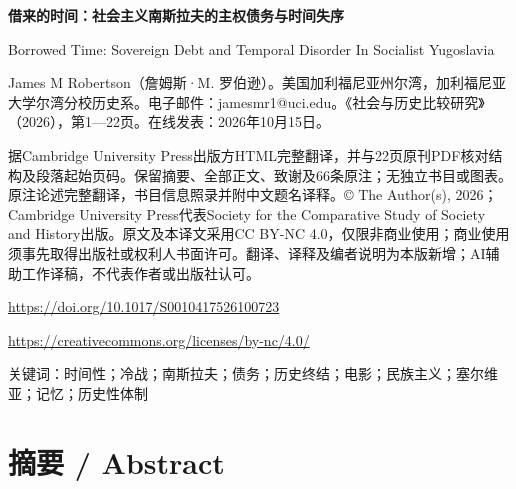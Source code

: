 \documentclass[10pt,a4paper]{article}
\begin{document}
{\Large\bfseries 借来的时间：社会主义南斯拉夫的主权债务与时间失序\par}\medskip
Borrowed Time: Sovereign Debt and Temporal Disorder In Socialist Yugoslavia\par
James M Robertson（詹姆斯·M. 罗伯逊）。美国加利福尼亚州尔湾，加利福尼亚大学尔湾分校历史系。电子邮件：jamesmr1@uci.edu。《社会与历史比较研究》（2026），第1—22页。在线发表：2026年10月15日。\par
据Cambridge University Press出版方HTML完整翻译，并与22页原刊PDF核对结构及段落起始页码。保留摘要、全部正文、致谢及66条原注；无独立书目或图表。原注论述完整翻译，书目信息照录并附中文题名译释。© The Author(s), 2026；Cambridge University Press代表Society for the Comparative Study of Society and History出版。原文及本译文采用CC BY-NC 4.0，仅限非商业使用；商业使用须事先取得出版社或权利人书面许可。翻译、译释及编者说明为本版新增；AI辅助工作译稿，不代表作者或出版社认可。\par
\url{https://doi.org/10.1017/S0010417526100723}\par
\url{https://creativecommons.org/licenses/by-nc/4.0/}\par
关键词：时间性；冷战；南斯拉夫；债务；历史终结；电影；民族主义；塞尔维亚；记忆；历史性体制\par\bigskip
{}\section*{摘要 / Abstract}
\end{document}
